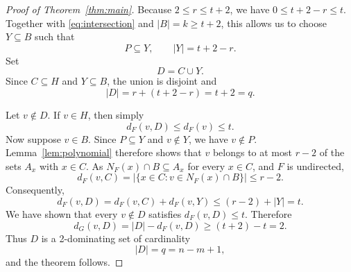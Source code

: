 \documentclass[10pt,a4paper]{amsart}
\begin{document}
\begin{proof}[Proof of Theorem~\ref{thm:main}]
Because $2\leq r\leq t+2$, we have $0\leq t+2-r\leq t$.  Together with
\eqref{eq:intersection} and $|B|=k\geq t+2$, this allows us to choose
$Y\subseteq B$ such that
\[
  P\subseteq Y,
  \qquad |Y|=t+2-r.
\]
Set
\[
  D=C\cup Y.
\]
Since $C\subseteq H$ and $Y\subseteq B$, the union is disjoint and
\[
  |D|=r+(t+2-r)=t+2=q.
\]

Let $v\notin D$.  If $v\in H$, then simply
\[
  d_F(v,D)\leq d_F(v)\leq t.
\]
Now suppose $v\in B$.  Since $P\subseteq Y$ and $v\notin Y$, we have
$v\notin P$.  Lemma~\ref{lem:polynomial} therefore shows that $v$ belongs to
at most $r-2$ of the sets $A_x$ with $x\in C$.  As
$N_F(x)\cap B\subseteq A_x$ for every $x\in C$, and $F$ is undirected,
\[
  d_F(v,C)
  =|\{x\in C:v\in N_F(x)\cap B\}|
  \leq r-2.
\]
Consequently,
\[
  d_F(v,D)=d_F(v,C)+d_F(v,Y)
  \leq (r-2)+|Y|=t.
\]
We have shown that every $v\notin D$ satisfies $d_F(v,D)\leq t$.  Therefore
\[
  d_G(v,D)=|D|-d_F(v,D)\geq(t+2)-t=2.
\]
Thus $D$ is a 2-dominating set of cardinality
\[
  |D|=q=n-m+1,
\]
and the theorem follows.
\end{proof}
\end{document}
